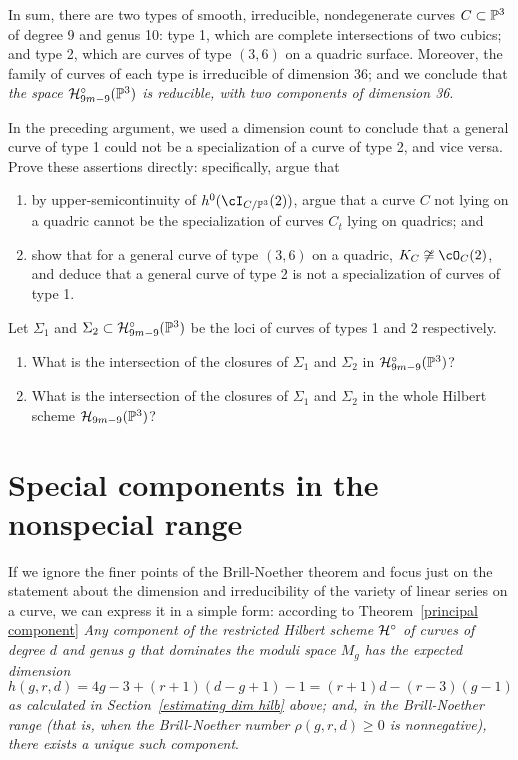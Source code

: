 In sum, there are two types of smooth, irreducible, nondegenerate curves $C \subset \PP^3$ of degree 9 and genus 10: type 1, which are complete intersections of two cubics; and type 2, which are curves of type $(3,6)$ on a quadric surface. Moreover, the family of curves of each type is irreducible of dimension 36; and we conclude that \emph{the space $\cH^\circ_{9m-9}(\PP^3)$ is reducible, with two components of dimension 36}.


\begin{exercise}
In the preceding argument, we used a dimension count to conclude that a general curve of type 1 could not be a specialization of a curve of type 2, and vice versa. Prove these assertions directly: specifically, argue that
\begin{enumerate}
\item by upper-semicontinuity of $h^0(\cI_{C/\PP^3}(2))$, argue that a curve $C$ not lying on a quadric cannot be the specialization of curves $C_t$ lying on quadrics; and
\item show that for a general curve of type $(3,6)$ on a quadric, $K_C \not\cong \cO_C(2)$, and deduce that a general curve of type 2 is not a specialization of curves of type 1.
\end{enumerate}
\end{exercise}

\begin{exercise}
Let $\Sigma_1$ and $\Sigma_2 \subset \cH^\circ_{9m-9}(\PP^3)$ be the loci of curves of types 1 and 2 respectively. 
\begin{enumerate}
\item What is the intersection of the closures of $\Sigma_1$ and $\Sigma_2$ in $\cH^\circ_{9m-9}(\PP^3)$?
\item What is the intersection of the closures of $\Sigma_1$ and $\Sigma_2$ in the whole Hilbert scheme $\cH_{9m-9}(\PP^3)$?
\end{enumerate}
\end{exercise}

 \section{Special components in the nonspecial range}

If we ignore the finer points of the Brill-Noether theorem and focus just on the statement about the dimension and irreducibility of the variety of linear series on a curve, we can express it in a simple form: according to Theorem~\ref{principal component} \emph{Any component of the restricted Hilbert scheme $\cH^\circ$ of curves of degree $d$ and genus $g$ that dominates the moduli space $M_g$ has the expected dimension 
$$
h(g,r,d) = 4g-3 + (r+1)(d-g+1) - 1 = (r+1)d - (r-3)(g-1)
$$
 as calculated in Section~\ref{estimating dim hilb} above; and, in the Brill-Noether range (that is, when the Brill-Noether number $\rho(g,r,d) \geq 0$ is nonnegative), there exists a unique such component}.
 
